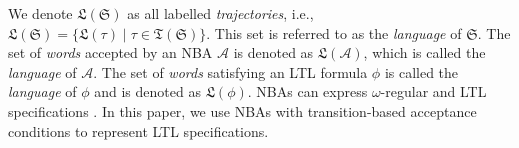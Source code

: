 \documentclass[acmlarge]{acmart}
\begin{document}
We denote $\mathfrak{L}(\mathfrak{S})$ as all labelled \emph{trajectories}, i.e., $\mathfrak{L}(\mathfrak{S})=\{\mathfrak{L}(\tau) \mid \tau \in \mathfrak{T}(\mathfrak{S})\}$. This set is referred to as the \emph{language} of \(\mathfrak{S}\). The set of \emph{words} accepted by an NBA \(\mathcal{A}\) is denoted as \(\mathfrak{L}(\mathcal{A})\), which is called the \emph{language} of $\mathcal{A}$. The set of \emph{words} satisfying an LTL formula \(\phi\) is called the \emph{language} of \(\phi\) and is denoted as \(\mathfrak{L}(\phi)\). NBAs can express $\omega$-regular and LTL specifications \cite{vardi2005automata}. In this paper, we use NBAs with transition-based acceptance conditions to represent LTL specifications.
\end{document}
